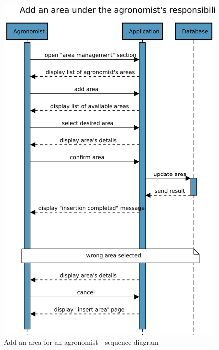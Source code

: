 \begin{figure}[H]
    \centering
    \includegraphics[scale=0.9]{Images/Sequence diagrams/Agronomist - add area.pdf}

    \caption{Add an area for an agronomist - sequence diagram}
    \label{fig:fig:seq_diag_insert_area}

    
\end{figure}


